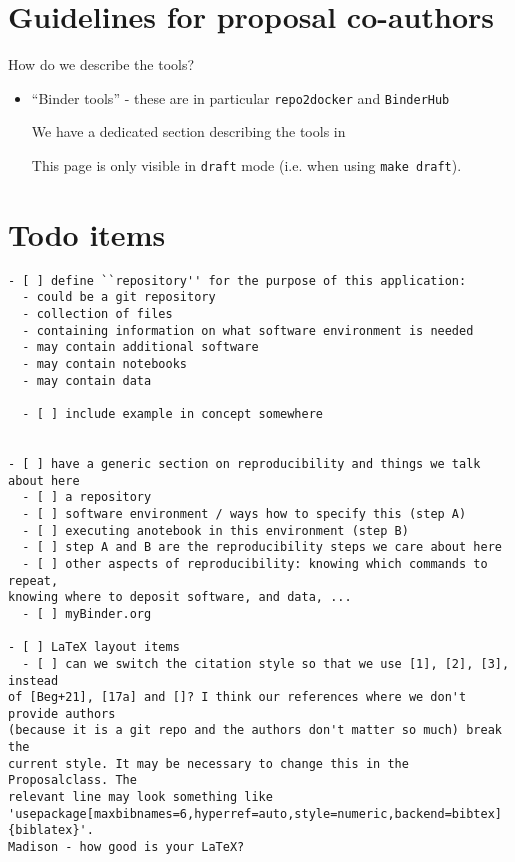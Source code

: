 \documentclass[
  deliverables,
  longtasklabels,
  noworkareas,
  svgnames,
  \classoptions
]{euproposal}       %
\newcommand{\softwarename}[1]{\texttt{#1}}
\newcommand{\repotodocker}{\softwarename{repo2docker}}
\newcommand{\binderhub}{\softwarename{BinderHub}}
\begin{document}
\begin{draft}


\section*{Guidelines for proposal co-authors}

How do we describe the tools?
\begin{itemize}
\item  ``Binder tools'' - these are in particular \repotodocker{} and
  \binderhub{}

  We have a dedicated section describing the tools in

  \vfill This page is only visible in \texttt{draft} mode (i.e. when using
  \texttt{make draft}).

\end{itemize}

\section*{Todo items}

\begin{verbatim}
- [ ] define ``repository'' for the purpose of this application:
  - could be a git repository
  - collection of files
  - containing information on what software environment is needed
  - may contain additional software
  - may contain notebooks
  - may contain data

  - [ ] include example in concept somewhere


- [ ] have a generic section on reproducibility and things we talk about here
  - [ ] a repository
  - [ ] software environment / ways how to specify this (step A)
  - [ ] executing anotebook in this environment (step B)
  - [ ] step A and B are the reproducibility steps we care about here
  - [ ] other aspects of reproducibility: knowing which commands to repeat,
knowing where to deposit software, and data, ...
  - [ ] myBinder.org

- [ ] LaTeX layout items
  - [ ] can we switch the citation style so that we use [1], [2], [3], instead
of [Beg+21], [17a] and []? I think our references where we don't provide authors
(because it is a git repo and the authors don't matter so much) break the
current style. It may be necessary to change this in the Proposalclass. The
relevant line may look something like
'usepackage[maxbibnames=6,hyperref=auto,style=numeric,backend=bibtex]{biblatex}'.
Madison - how good is your LaTeX?

\end{verbatim}

\end{draft}
\clearpage
\end{document}
